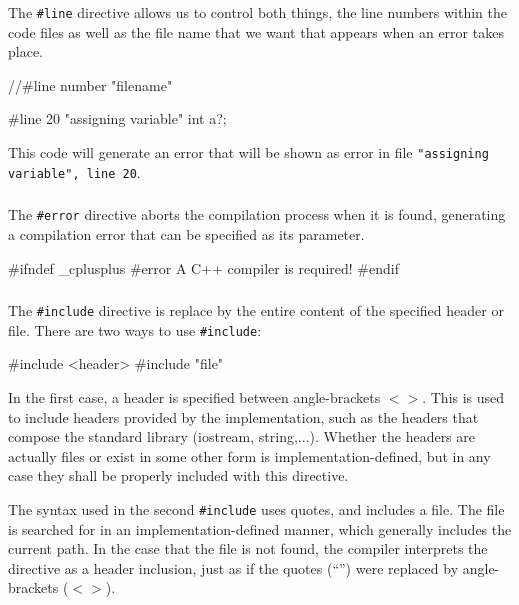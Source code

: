 \documentclass[10pt,a4paper]{scrartcl}
\begin{document}
\begin{multicols*}{2}
The \verb+#line+ directive allows us to control both things, the line numbers within the code files as well as the file name that we want that appears when an error takes place.

\begin{TPCpp}
//#line number "filename"

#line 20 "assigning variable"
int a?;
\end{TPCpp}

This code will generate an error that will be shown as error in file \verb+"assigning variable", line 20+.

\subsubsection{}

The \verb+#error+ directive aborts the compilation process when it is found, generating a compilation error that can be specified as its parameter.

\begin{TPCpp}
#ifndef _cplusplus
#error A C++ compiler is required!
#endif
\end{TPCpp}

\subsubsection{}

The \verb+#include+ directive is replace by the entire content of the specified header or file. There are two ways to use \verb+#include+:

\begin{TPCpp}
#include <header>
#include "file"
\end{TPCpp}

In the first case, a header is specified between angle-brackets $<>$. This is used to include headers provided by the implementation, such as the headers that compose the standard library (iostream, string,...). Whether the headers are actually files or exist in some other form is implementation-defined, but in any case they shall be properly included with this directive.

The syntax used in the second \verb+#include+ uses quotes, and includes a file. The file is searched for in an implementation-defined manner, which generally includes the current path. In the case that the file is not found, the compiler interprets the directive as a header inclusion, just as if the quotes (``'') were replaced by angle-brackets ($<>$).


\end{multicols*}
\end{document}

